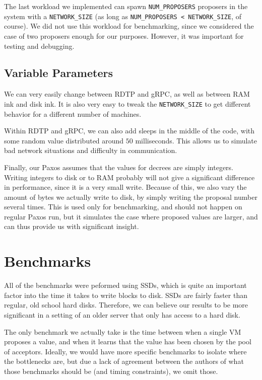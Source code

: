\documentclass[12pt,]{article}
\begin{document}
The last workload we implemented can spawn \texttt{NUM\_PROPOSERS}
proposers in the system with a \texttt{NETWORK\_SIZE} (as long as
\texttt{NUM\_PROPOSERS\ \textless{}\ NETWORK\_SIZE}, of course). We did
not use this workload for benchmarking, since we considered the case of
two proposers enough for our purposes. However, it was important for
testing and debugging.

\subsection{Variable Parameters}\label{variable-parameters}

We can very easily change between RDTP and gRPC, as well as between RAM
ink and disk ink. It is also very easy to tweak the
\texttt{NETWORK\_SIZE} to get different behavior for a different number
of machines.

Within RDTP and gRPC, we can also add sleeps in the middle of the code,
with some random value distributed around \(50\) milliseconds. This
allows us to simulate bad network situations and difficulty in
communication.

Finally, our Paxos assumes that the values for decrees are simply
integers. Writing integers to disk or to RAM probably will not give a
significant difference in performance, since it is a very small write.
Because of this, we also vary the amount of bytes we actually write to
disk, by simply writing the proposal number several times. This is used
only for benchmarking, and should not happen on regular Paxos run, but
it simulates the case where proposed values are larger, and can thus
provide us with significant insight.

\section{Benchmarks}\label{benchmarks}

All of the benchmarks were peformed using SSDs, which is quite an
important factor into the time it takes to write blocks to disk. SSDs
are fairly faster than regular, old school hard disks. Therefore, we can
believe our results to be more significant in a setting of an older
server that only has access to a hard disk.

The only benchmark we actually take is the time between when a single VM
proposes a value, and when it learns that the value has been chosen by
the pool of acceptors. Ideally, we would have more specific benchmarks
to isolate where the bottlenecks are, but due a lack of agreement
between the authors of what those benchmarks should be (and timing
constraints), we omit those.
\end{document}
